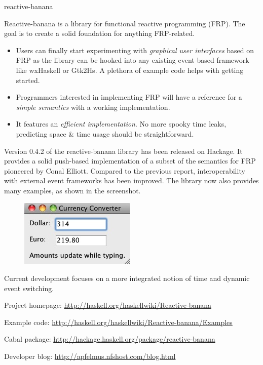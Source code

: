 \begin{hcarentry}[updated]{reactive-banana}
\makeheader

Reactive-banana is a library for functional reactive programming (FRP). The goal is to create a solid foundation for anything FRP-related.

\begin{itemize}
\item Users can finally start experimenting with \emph{graphical user interfaces} based on FRP as the library can be hooked into any existing event-based framework like wxHaskell or Gtk2Hs. A plethora of example code helps with getting started.
\item Programmers interested in implementing FRP will have a reference for a \emph{simple semantics} with a working implementation.
\item It features an \emph{efficient implementation}. No more spooky time leaks, predicting space \& time usage should be straightforward.
\end{itemize}

Version 0.4.2 of the reactive-banana library has been released on Hackage. It provides a solid push-based implementation of a subset of the semantics for FRP pioneered by Conal Elliott. Compared to the previous report, interoperability with external event frameworks has been improved. The library now also provides many examples, as shown in the screenshot.

\begin{figure}
\includegraphics{hcar-reactive-banana-01.jpg}
\end{figure}

Current development focuses on a more integrated notion of time and dynamic event switching.

\FurtherReading
\begin{compactitem}
\item Project homepage: \url{http://haskell.org/haskellwiki/Reactive-banana}
\item Example code: \url{http://haskell.org/haskellwiki/Reactive-banana/Examples}
\item Cabal package: \url{http://hackage.haskell.org/package/reactive-banana}
\item Developer blog:  \url{http://apfelmus.nfshost.com/blog.html}
\end{compactitem}
\end{hcarentry}
